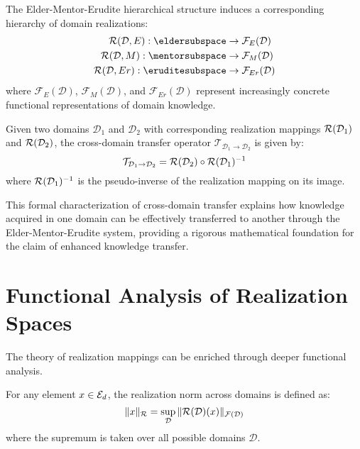\begin{theorem}
The Elder-Mentor-Erudite hierarchical structure induces a corresponding hierarchy of domain realizations:
\begin{align}
\realization{\mathcal{D},E}: \eldersubspace &\rightarrow \mathcal{F}_E(\mathcal{D}) \\
\realization{\mathcal{D},M}: \mentorsubspace &\rightarrow \mathcal{F}_M(\mathcal{D}) \\
\realization{\mathcal{D},Er}: \eruditesubspace &\rightarrow \mathcal{F}_{Er}(\mathcal{D})
\end{align}
where $\mathcal{F}_E(\mathcal{D})$, $\mathcal{F}_M(\mathcal{D})$, and $\mathcal{F}_{Er}(\mathcal{D})$ represent increasingly concrete functional representations of domain knowledge.
\end{theorem}

\begin{corollary}
Given two domains $\mathcal{D}_1$ and $\mathcal{D}_2$ with corresponding realization mappings $\mathcal{R}(\mathcal{D}_1)$ and $\mathcal{R}(\mathcal{D}_2)$, the cross-domain transfer operator $\mathcal{T}_{\mathcal{D}_1 \rightarrow \mathcal{D}_2}$ is given by:
\begin{equation}
\mathcal{T}_{\mathcal{D}_1 \rightarrow \mathcal{D}_2} = \mathcal{R}(\mathcal{D}_2) \circ \mathcal{R}(\mathcal{D}_1)^{-1}
\end{equation}
where $\mathcal{R}(\mathcal{D}_1)^{-1}$ is the pseudo-inverse of the realization mapping on its image.
\end{corollary}

This formal characterization of cross-domain transfer explains how knowledge acquired in one domain can be effectively transferred to another through the Elder-Mentor-Erudite system, providing a rigorous mathematical foundation for the claim of enhanced knowledge transfer.

\section{Functional Analysis of Realization Spaces}

The theory of realization mappings can be enriched through deeper functional analysis.

\begin{definition}
For any element $x \in \mathcal{E}_{d}$, the realization norm across domains is defined as:
\begin{equation}
\|x\|_{\mathcal{R}} = \sup_{\mathcal{D}} \|\mathcal{R}(\mathcal{D})(x)\|_{\mathcal{F}(\mathcal{D})}
\end{equation}
where the supremum is taken over all possible domains $\mathcal{D}$.
\end{definition}

